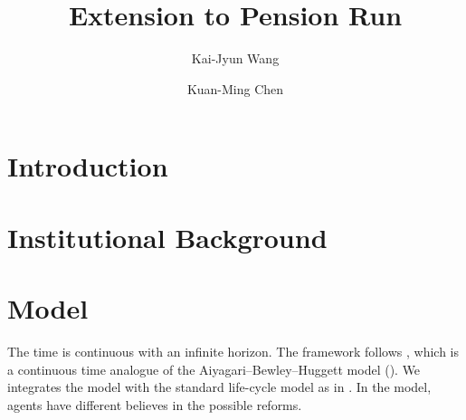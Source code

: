 \documentclass[a4paper, 12pt]{article}
\title{Extension to Pension Run}
\author{Kai-Jyun Wang\and Kuan-Ming Chen}
\begin{document}
 

\maketitle

\section{Introduction}


\section{Institutional Background}

\section{Model}
The time is continuous with an infinite horizon. The 
framework follows \cite{achdou2022}, which is a continuous 
time analogue of the Aiyagari–Bewley–Huggett model 
(\cite{aiyagari1994,huggett1993}). We integrates the model 
with the standard life-cycle model as in \cite{huggett1996}. 
In the model, agents have different believes in the 
possible reforms.  
\end{document}
